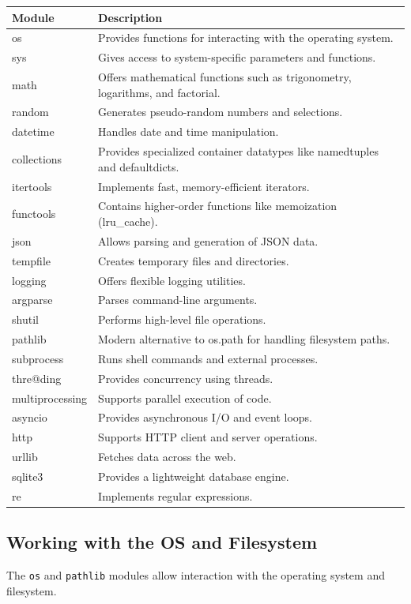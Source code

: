 \begin{center}
\begin{tabular}{|l|p{10cm}|}
\hline
\textbf{Module} & \textbf{Description} \\
\hline
os & Provides functions for interacting with the operating system. \\
sys & Gives access to system-specific parameters and functions. \\
math & Offers mathematical functions such as trigonometry, logarithms, and factorial. \\
random & Generates pseudo-random numbers and selections. \\
datetime & Handles date and time manipulation. \\
collections & Provides specialized container datatypes like namedtuples and defaultdicts. \\
itertools & Implements fast, memory-efficient iterators. \\
functools & Contains higher-order functions like memoization (lru\_cache). \\
json & Allows parsing and generation of JSON data. \\
tempfile & Creates temporary files and directories. \\
logging & Offers flexible logging utilities. \\
argparse & Parses command-line arguments. \\
shutil & Performs high-level file operations. \\
pathlib & Modern alternative to os.path for handling filesystem paths. \\
subprocess & Runs shell commands and external processes. \\
thre@ding & Provides concurrency using threads. \\
multiprocessing & Supports parallel execution of code. \\
asyncio & Provides asynchronous I/O and event loops. \\
http & Supports HTTP client and server operations. \\
urllib & Fetches data across the web. \\
sqlite3 & Provides a lightweight database engine. \\
re & Implements regular expressions. \\
\hline
\end{tabular}
\end{center}

\subsection{Working with the OS and Filesystem}
The \texttt{os} and \texttt{pathlib} modules allow interaction with the operating system and filesystem.

